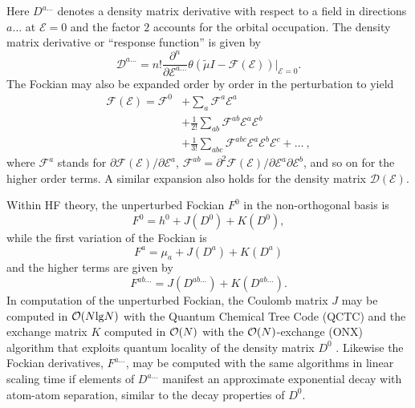 \documentclass[prl,aps,preprint,showpacs,superbib]{revtex4}
\def\F{\mathcal{F}}
\def\D{\mathcal{D}}
\def\E{\mathcal{E}}
\begin{document}
Here $D^{a\ldots}$ denotes a density matrix derivative with respect to a field in directions $a\ldots$ 
at $\mathcal{E} = 0$ and the factor $2$ accounts for the orbital occupation. 
The  density matrix derivative or ``response function'' is given by 
\begin{equation}
 \displaystyle\D^{a\ldots}=n!
 \frac{\partial^n}{\partial\E^{a\ldots}}\theta(\tilde{\mu}I-
 \F(\E))\bigg|_{\E=0} \label{DDeriv1}.
\end{equation}
 The Fockian may also be expanded order by order in the perturbation to yield
\begin{equation}\label{FockianTaylor}
  \begin{split}
    \F(\E)=\F^{0} & +\sum_a \F^{a}\E^{a}\\
    &+\frac{1}{2!}\sum_{ab} \F^{ab}\E^{a}\E^{b}\\
    &+\frac{1}{3!}\sum_{abc} \F^{abc}\E^{a}\E^{b}\E^{c}+\dots ~,
  \end{split}
\end{equation}
where $\F^{a}$ stands for $\partial\F(\E)/\partial\E^{a}$,
$\F^{ab}=\partial^2\F(\E)/\partial\E^{a}\partial\E^{b}$,
and so on for the higher order terms.
A similar expansion also holds for the density matrix $\D(\E)$.

Within HF theory, the unperturbed Fockian $F^0$ in the non-orthogonal basis is 
\begin{equation}
F^0=h^0+J(D^0)+K(D^0), \label{fockian0}
\end{equation}
while the first variation of the Fockian is 
\begin{equation}
F^a=\mu_a+J(D^a)+K(D^a)
\end{equation}
and the higher terms are given by 
\begin{equation}
F^{ab\ldots}=J(D^{ab\ldots})+K(D^{ab\ldots}). \label{fockianN}
\end{equation}
In computation of the unperturbed Fockian, the Coulomb matrix $J$ may be computed in ${\cal O}(N{\rm lg}N)$ 
with the Quantum Chemical Tree Code (QCTC) \cite{MChallacombe97} and the
exchange matrix $K$ computed in ${\cal O}(N)$ with the ${\cal O}(N)$-exchange  (ONX) algorithm 
that exploits quantum locality of the density matrix $D^0$ \cite{ESchwegler97}.
Likewise the Fockian derivatives, $F^{a\ldots}$, may be computed 
with the same algorithms in linear scaling time if elements of 
$D^{a\ldots}$ manifest an approximate exponential decay with atom-atom separation, 
similar to the decay properties of $D^0$. 
\end{document}
